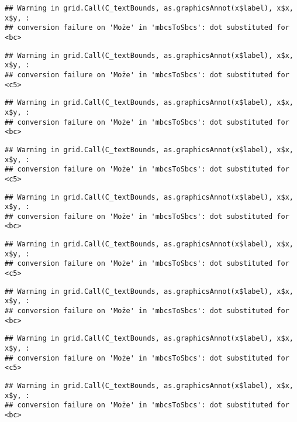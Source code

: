 \documentclass[
]{book}
\begin{document}
\begin{verbatim}
## Warning in grid.Call(C_textBounds, as.graphicsAnnot(x$label), x$x, x$y, :
## conversion failure on 'Może' in 'mbcsToSbcs': dot substituted for <bc>
\end{verbatim}

\begin{verbatim}
## Warning in grid.Call(C_textBounds, as.graphicsAnnot(x$label), x$x, x$y, :
## conversion failure on 'Może' in 'mbcsToSbcs': dot substituted for <c5>
\end{verbatim}

\begin{verbatim}
## Warning in grid.Call(C_textBounds, as.graphicsAnnot(x$label), x$x, x$y, :
## conversion failure on 'Może' in 'mbcsToSbcs': dot substituted for <bc>
\end{verbatim}

\begin{verbatim}
## Warning in grid.Call(C_textBounds, as.graphicsAnnot(x$label), x$x, x$y, :
## conversion failure on 'Może' in 'mbcsToSbcs': dot substituted for <c5>
\end{verbatim}

\begin{verbatim}
## Warning in grid.Call(C_textBounds, as.graphicsAnnot(x$label), x$x, x$y, :
## conversion failure on 'Może' in 'mbcsToSbcs': dot substituted for <bc>
\end{verbatim}

\begin{verbatim}
## Warning in grid.Call(C_textBounds, as.graphicsAnnot(x$label), x$x, x$y, :
## conversion failure on 'Może' in 'mbcsToSbcs': dot substituted for <c5>
\end{verbatim}

\begin{verbatim}
## Warning in grid.Call(C_textBounds, as.graphicsAnnot(x$label), x$x, x$y, :
## conversion failure on 'Może' in 'mbcsToSbcs': dot substituted for <bc>
\end{verbatim}

\begin{verbatim}
## Warning in grid.Call(C_textBounds, as.graphicsAnnot(x$label), x$x, x$y, :
## conversion failure on 'Może' in 'mbcsToSbcs': dot substituted for <c5>
\end{verbatim}

\begin{verbatim}
## Warning in grid.Call(C_textBounds, as.graphicsAnnot(x$label), x$x, x$y, :
## conversion failure on 'Może' in 'mbcsToSbcs': dot substituted for <bc>
\end{verbatim}
\end{document}
